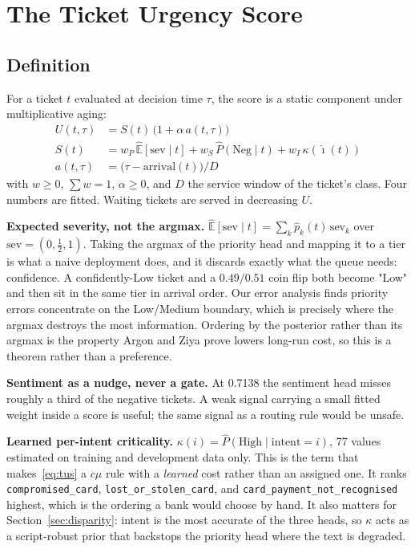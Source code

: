 \section{The Ticket Urgency Score}
\label{sec:score}

\subsection{Definition}

For a ticket $t$ evaluated at decision time $\tau$, the score is a static
component under multiplicative aging:
\begin{align}
U(t,\tau) &= S(t)\,\bigl(1 + \alpha\, a(t,\tau)\bigr) \label{eq:tus}\\
S(t) &= w_P\,\hat{\mathbb{E}}[\mathrm{sev}\mid t] + w_S\,\hat{P}(\mathrm{Neg}\mid t)
        + w_I\,\kappa(\hat{\imath}(t)) \nonumber\\
a(t,\tau) &= \bigl(\tau - \mathrm{arrival}(t)\bigr) / D \nonumber
\end{align}
with $w \ge 0$, $\sum w = 1$, $\alpha \ge 0$, and $D$ the service window of the
ticket's class. Four numbers are fitted. Waiting tickets are served in
decreasing $U$.

\textbf{Expected severity, not the argmax.}
$\hat{\mathbb{E}}[\mathrm{sev}\mid t] = \sum_k \hat{p}_k(t)\,\mathrm{sev}_k$ over
$\mathrm{sev} = (0, \tfrac12, 1)$. Taking the argmax of the priority head and
mapping it to a tier is what a naive deployment does, and it discards exactly
what the queue needs: confidence. A confidently-Low ticket and a $0.49/0.51$
coin flip both become "Low" and then sit in the same tier in arrival order. Our
error analysis finds priority errors concentrate on the Low/Medium boundary,
which is precisely where the argmax destroys the most information. Ordering by
the posterior rather than its argmax is the property Argon and Ziya
\cite{argon2009priority} prove lowers long-run cost, so this is a theorem rather
than a preference.

\textbf{Sentiment as a nudge, never a gate.} At 0.7138 \negf{} the sentiment head
misses roughly a third of the negative tickets. A weak signal carrying a
small fitted weight inside a score is useful; the same signal as a routing rule
would be unsafe.

\textbf{Learned per-intent criticality.} $\kappa(i) = \hat{P}(\text{High} \mid
\text{intent}=i)$, 77 values estimated on training and development data only.
This is the term that makes~\eqref{eq:tus} a $c\mu$ rule \cite{cox1961queues}
with a \emph{learned} cost rather than an assigned one. It ranks
\texttt{compromised\_card}, \texttt{lost\_or\_stolen\_card}, and
\texttt{card\_payment\_not\_recognised} highest, which is the ordering a bank
would choose by hand. It also matters for Section~\ref{sec:disparity}: intent is
the most accurate of the three heads, so $\kappa$ acts as a script-robust prior
that backstops the priority head where the text is degraded.

